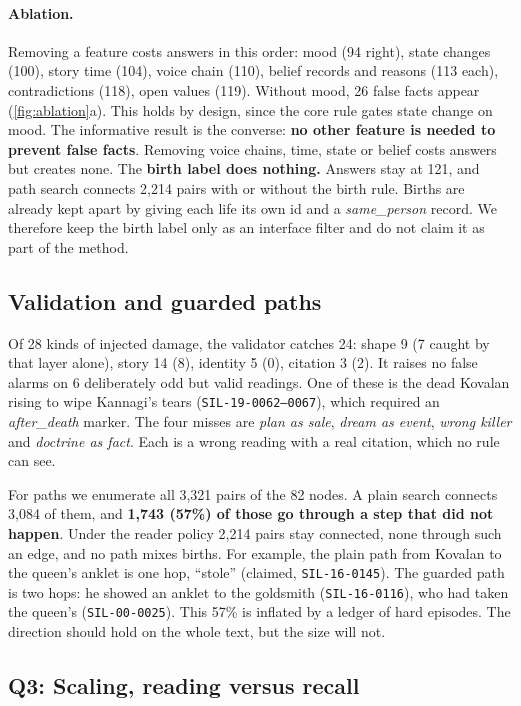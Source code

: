 \documentclass[11pt]{article}
\newcommand{\lid}[1]{\texttt{\small #1}}
\begin{document}
\paragraph{Ablation.} Removing a feature costs answers in this order: mood (94 right), state changes (100), story time (104), voice chain (110), belief records and reasons (113 each), contradictions (118), open values (119). Without mood, 26 false facts appear (\cref{fig:ablation}a). This holds by design, since the core rule gates state change on mood. The informative result is the converse: \textbf{no other feature is needed to prevent false facts}. Removing voice chains, time, state or belief costs answers but creates none. The \textbf{birth label does nothing.} Answers stay at 121, and path search connects 2,214 pairs with or without the birth rule. Births are already kept apart by giving each life its own id and a \emph{same\_person} record. We therefore keep the birth label only as an interface filter and do not claim it as part of the method.

\subsection{Validation and guarded paths}
\label{sec:paths}
Of 28 kinds of injected damage, the validator catches 24: shape 9 (7 caught by that layer alone), story 14 (8), identity 5 (0), citation 3 (2). It raises no false alarms on 6 deliberately odd but valid readings. One of these is the dead Kovalan rising to wipe Kannagi's tears (\lid{SIL-19-0062--0067}), which required an \emph{after\_death} marker. The four misses are \emph{plan as sale}, \emph{dream as event}, \emph{wrong killer} and \emph{doctrine as fact}. Each is a wrong reading with a real citation, which no rule can see.

For paths we enumerate all 3,321 pairs of the 82 nodes. A plain search connects 3,084 of them, and \textbf{1,743 (57\%) of those go through a step that did not happen}. Under the reader policy 2,214 pairs stay connected, none through such an edge, and no path mixes births. For example, the plain path from Kovalan to the queen's anklet is one hop, ``stole'' (claimed, \lid{SIL-16-0145}). The guarded path is two hops: he showed an anklet to the goldsmith (\lid{SIL-16-0116}), who had taken the queen's (\lid{SIL-00-0025}). This 57\% is inflated by a ledger of hard episodes. The direction should hold on the whole text, but the size will not.

\subsection{Q3: Scaling, reading versus recall}
\label{sec:scale}
\end{document}
